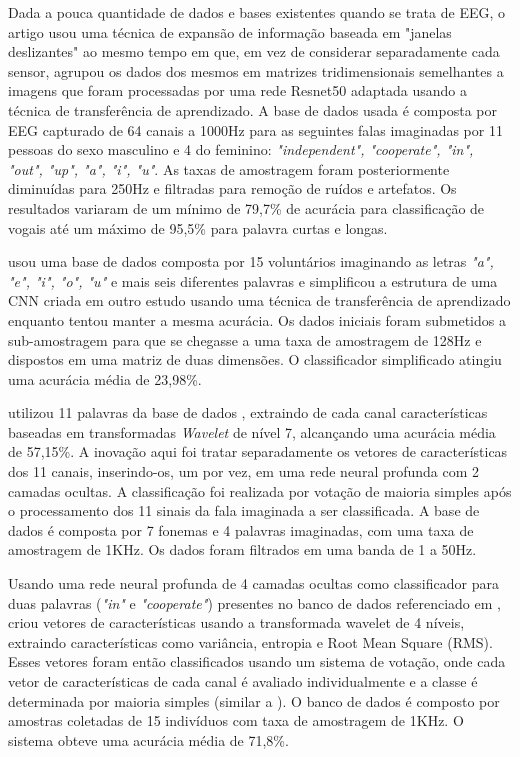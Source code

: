 			\par Dada a pouca quantidade de dados e bases existentes quando se trata de EEG, o artigo \cite{PanachakelJerrinRamakrishnan} usou uma técnica de expansão de informação baseada em "janelas deslizantes" ao mesmo tempo em que, em vez de considerar separadamente cada sensor, agrupou os dados dos mesmos em matrizes tridimensionais semelhantes a imagens que foram processadas por uma rede Resnet50 \cite{DBLP:journals/corr/HeZRS15} adaptada usando a técnica de transferência de aprendizado. A base de dados usada \cite{nguyen2018inferring} é composta por EEG capturado de 64 canais a 1000Hz para as seguintes falas imaginadas por 11 pessoas do sexo masculino e 4 do feminino: \textit{"independent", "cooperate", "in", "out", "up", "a", "i", "u"}. As taxas de amostragem foram posteriormente diminuídas para 250Hz e filtradas para remoção de ruídos e artefatos. Os resultados variaram de um mínimo de 79,7\% de acurácia para classificação de vogais até um máximo de 95,5\% para palavra curtas e longas.
			
			\par \cite{tamm2020classification} usou uma base de dados composta por 15 voluntários imaginando as letras \textit{"a", "e", "i", "o", "u"} e mais seis diferentes palavras \cite{10.1117/12.2255697} e simplificou a estrutura de uma CNN criada em outro estudo usando uma técnica de transferência de aprendizado enquanto tentou manter a mesma acurácia. Os dados iniciais foram submetidos a sub-amostragem para que se chegasse a uma taxa de amostragem de 128Hz e dispostos em uma matriz de duas dimensões. O classificador simplificado atingiu uma acurácia média de 23,98\%.
			
			\par \cite{Panachakel_2019} utilizou 11 palavras da base de dados \cite{7178118}, extraindo de cada canal características baseadas em transformadas \textit{Wavelet} de nível 7, alcançando uma acurácia média de 57,15\%. A inovação aqui foi tratar separadamente os vetores de características dos 11 canais, inserindo-os, um por vez, em uma rede neural profunda com 2 camadas ocultas. A classificação foi realizada por votação de maioria simples após o processamento dos 11 sinais da fala imaginada a ser classificada. A base de dados é composta por 7 fonemas e 4 palavras imaginadas, com uma taxa de amostragem de 1KHz. Os dados foram filtrados em uma banda de 1 a 50Hz.
			
			\par Usando uma rede neural profunda de 4 camadas ocultas como classificador para duas palavras (\textit{"in"} e \textit{"cooperate"}) presentes no banco de dados referenciado em \cite{dasalla2009single}, \cite{panachakel2020novel} criou vetores de características usando a transformada wavelet de 4 níveis, extraindo características como variância, entropia e Root Mean Square (RMS). Esses vetores foram então classificados usando um sistema de votação, onde cada vetor de características de cada canal é avaliado individualmente e a classe é determinada por maioria simples (similar a \cite{Panachakel_2019}). O banco de dados é composto por amostras coletadas de 15 indivíduos com taxa de amostragem de 1KHz. O sistema obteve uma acurácia média de 71,8\%.
			
